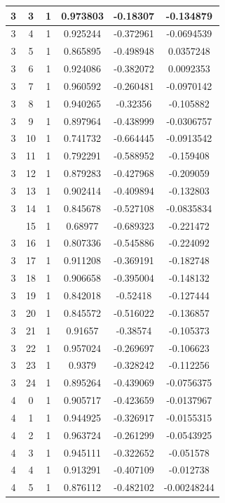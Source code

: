 \documentclass[12pt,a4paper]{article}
\numberwithin{equation}{section}
\numberwithin{figure}{section}
\numberwithin{table}{section}
\begin{document}
\begin{longtable}{|c|c|c|c|c|c|}
3 & 3 & 1 & 0.973803 & -0.18307 & -0.134879 \\ \hline
3 & 4 & 1 & 0.925244 & -0.372961 & -0.0694539 \\ \hline
3 & 5 & 1 & 0.865895 & -0.498948 & 0.0357248 \\ \hline
3 & 6 & 1 & 0.924086 & -0.382072 & 0.0092353 \\ \hline
3 & 7 & 1 & 0.960592 & -0.260481 & -0.0970142 \\ \hline
3 & 8 & 1 & 0.940265 & -0.32356 & -0.105882 \\ \hline
3 & 9 & 1 & 0.897964 & -0.438999 & -0.0306757 \\ \hline
3 & 10 & 1 & 0.741732 & -0.664445 & -0.0913542 \\ \hline
3 & 11 & 1 & 0.792291 & -0.588952 & -0.159408 \\ \hline
3 & 12 & 1 & 0.879283 & -0.427968 & -0.209059 \\ \hline
3 & 13 & 1 & 0.902414 & -0.409894 & -0.132803 \\ \hline
3 & 14 & 1 & 0.845678 & -0.527108 & -0.0835834 \\ \hline
\pagebreak
3 & 15 & 1 & 0.68977 & -0.689323 & -0.221472 \\ \hline
3 & 16 & 1 & 0.807336 & -0.545886 & -0.224092 \\ \hline
3 & 17 & 1 & 0.911208 & -0.369191 & -0.182748 \\ \hline
3 & 18 & 1 & 0.906658 & -0.395004 & -0.148132 \\ \hline
3 & 19 & 1 & 0.842018 & -0.52418 & -0.127444 \\ \hline
3 & 20 & 1 & 0.845572 & -0.516022 & -0.136857 \\ \hline
3 & 21 & 1 & 0.91657 & -0.38574 & -0.105373 \\ \hline
3 & 22 & 1 & 0.957024 & -0.269697 & -0.106623 \\ \hline
3 & 23 & 1 & 0.9379 & -0.328242 & -0.112256 \\ \hline
3 & 24 & 1 & 0.895264 & -0.439069 & -0.0756375 \\ \hline
4 & 0 & 1 & 0.905717 & -0.423659 & -0.0137967 \\ \hline
4 & 1 & 1 & 0.944925 & -0.326917 & -0.0155315 \\ \hline
4 & 2 & 1 & 0.963724 & -0.261299 & -0.0543925 \\ \hline
4 & 3 & 1 & 0.945111 & -0.322652 & -0.051578 \\ \hline
4 & 4 & 1 & 0.913291 & -0.407109 & -0.012738 \\ \hline
4 & 5 & 1 & 0.876112 & -0.482102 & -0.00248244 \\ \hline

\end{longtable}
\end{document}
